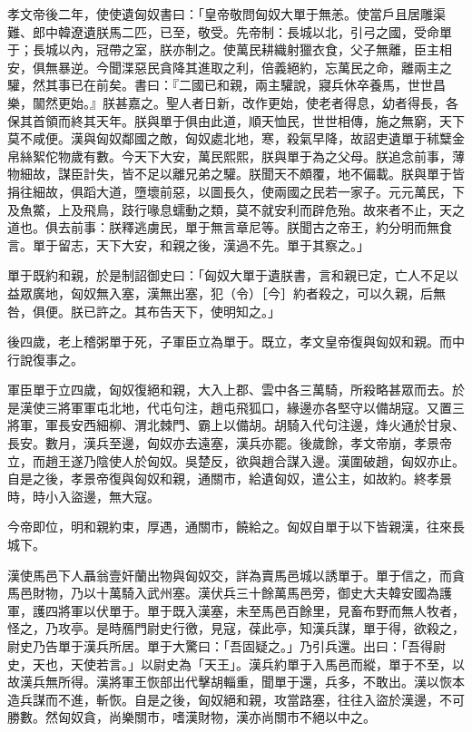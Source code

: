 \begin{pinyinscope}
孝文帝後二年，使使遺匈奴書曰：「皇帝敬問匈奴大單于無恙。使當戶且居雕渠難、郎中韓遼遺朕馬二匹，已至，敬受。先帝制：長城以北，引弓之國，受命單于；長城以內，冠帶之室，朕亦制之。使萬民耕織射獵衣食，父子無離，臣主相安，俱無暴逆。今聞渫惡民貪降其進取之利，倍義絕約，忘萬民之命，離兩主之驩，然其事已在前矣。書曰：『二國已和親，兩主驩說，寢兵休卒養馬，世世昌樂，闟然更始。』朕甚嘉之。聖人者日新，改作更始，使老者得息，幼者得長，各保其首領而終其天年。朕與單于俱由此道，順天恤民，世世相傳，施之無窮，天下莫不咸便。漢與匈奴鄰國之敵，匈奴處北地，寒，殺氣早降，故詔吏遺單于秫糱金帛絲絮佗物歲有數。今天下大安，萬民熙熙，朕與單于為之父母。朕追念前事，薄物細故，謀臣計失，皆不足以離兄弟之驩。朕聞天不頗覆，地不偏載。朕與單于皆捐往細故，俱蹈大道，墮壞前惡，以圖長久，使兩國之民若一家子。元元萬民，下及魚鱉，上及飛鳥，跂行喙息蠕動之類，莫不就安利而辟危殆。故來者不止，天之道也。俱去前事：朕釋逃虜民，單于無言章尼等。朕聞古之帝王，約分明而無食言。單于留志，天下大安，和親之後，漢過不先。單于其察之。」

單于既約和親，於是制詔御史曰：「匈奴大單于遺朕書，言和親已定，亡人不足以益眾廣地，匈奴無入塞，漢無出塞，犯（令）［今］約者殺之，可以久親，后無咎，俱便。朕已許之。其布告天下，使明知之。」

後四歲，老上稽粥單于死，子軍臣立為單于。既立，孝文皇帝復與匈奴和親。而中行說復事之。

軍臣單于立四歲，匈奴復絕和親，大入上郡、雲中各三萬騎，所殺略甚眾而去。於是漢使三將軍軍屯北地，代屯句注，趙屯飛狐口，緣邊亦各堅守以備胡寇。又置三將軍，軍長安西細柳、渭北棘門、霸上以備胡。胡騎入代句注邊，烽火通於甘泉、長安。數月，漢兵至邊，匈奴亦去遠塞，漢兵亦罷。後歲餘，孝文帝崩，孝景帝立，而趙王遂乃陰使人於匈奴。吳楚反，欲與趙合謀入邊。漢圍破趙，匈奴亦止。自是之後，孝景帝復與匈奴和親，通關市，給遺匈奴，遣公主，如故約。終孝景時，時小入盜邊，無大寇。

今帝即位，明和親約束，厚遇，通關市，饒給之。匈奴自單于以下皆親漢，往來長城下。

漢使馬邑下人聶翁壹奸蘭出物與匈奴交，詳為賣馬邑城以誘單于。單于信之，而貪馬邑財物，乃以十萬騎入武州塞。漢伏兵三十餘萬馬邑旁，御史大夫韓安國為護軍，護四將軍以伏單于。單于既入漢塞，未至馬邑百餘里，見畜布野而無人牧者，怪之，乃攻亭。是時鴈門尉史行徼，見寇，葆此亭，知漢兵謀，單于得，欲殺之，尉史乃告單于漢兵所居。單于大驚曰：「吾固疑之。」乃引兵還。出曰：「吾得尉史，天也，天使若言。」以尉史為「天王」。漢兵約單于入馬邑而縱，單于不至，以故漢兵無所得。漢將軍王恢部出代擊胡輜重，聞單于還，兵多，不敢出。漢以恢本造兵謀而不進，斬恢。自是之後，匈奴絕和親，攻當路塞，往往入盜於漢邊，不可勝數。然匈奴貪，尚樂關市，嗜漢財物，漢亦尚關市不絕以中之。


\end{pinyinscope}

